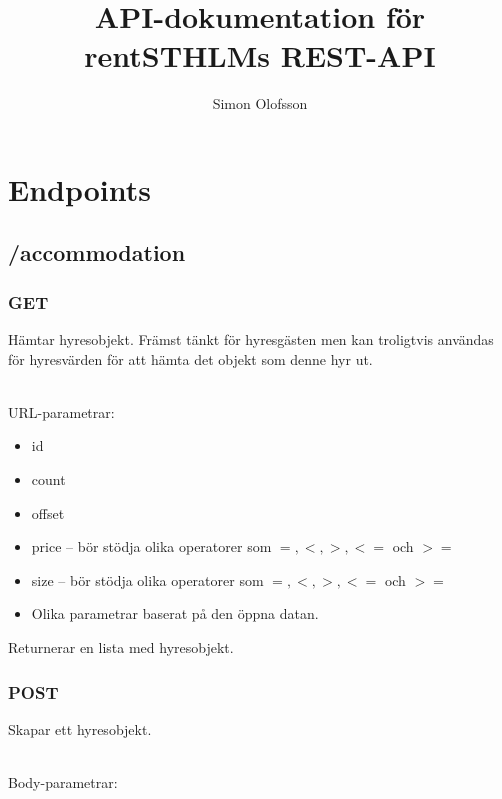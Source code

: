 \documentclass{article}
\title{API-dokumentation för rentSTHLMs REST-API}
\author{Simon Olofsson}
\date{}
\begin{document}

\maketitle

\newpage

\tableofcontents

\newpage

\section {Endpoints}
\label{sec:Endpoints}

\subsection {/accommodation}
\label{sub:/accommodation}

\subsubsection {GET}
\label{ssub:GET}

Hämtar hyresobjekt. Främst tänkt för hyresgästen men kan troligtvis användas för hyresvärden för att hämta det objekt som denne hyr ut.

\\URL-parametrar:

\begin{itemize}
    \item id
    \item count
    \item offset
    \item price -- bör stödja olika operatorer som \(=, <, >, <=\) och \(>=\)
    \item size -- bör stödja olika operatorer som \(=, <, >, <=\) och \(>=\)
    \item Olika parametrar baserat på den öppna datan.
\end{itemize}

Returnerar en lista med hyresobjekt.

\subsubsection {POST}
\label{ssub:POST}

Skapar ett hyresobjekt.

\\Body-parametrar:
\end{document}
